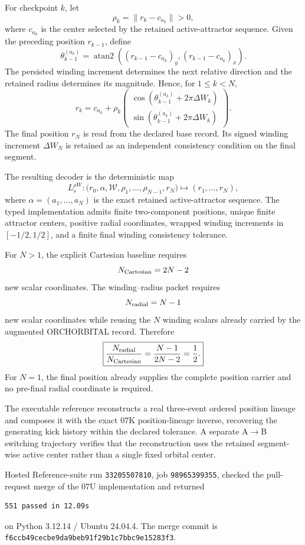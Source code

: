 For checkpoint $k$, let
\[
\rho_k=\|r_k-c_{a_k}\|>0,
\]
where $c_{a_k}$ is the center selected by the retained active-attractor sequence. Given the preceding position $r_{k-1}$, define
\[
\theta_{k-1}^{(a_k)}
=\operatorname{atan2}\!\left(
(r_{k-1}-c_{a_k})_y,
(r_{k-1}-c_{a_k})_x
\right).
\]
The persisted winding increment determines the next relative direction and the retained radius determines its magnitude. Hence, for $1\le k<N$,
\[
\boxed{
r_k=c_{a_k}+\rho_k
\begin{pmatrix}
\cos\!\left(\theta_{k-1}^{(a_k)}+2\pi\Delta W_k\right)\\
\sin\!\left(\theta_{k-1}^{(a_k)}+2\pi\Delta W_k\right)
\end{pmatrix}.
}
\]
The final position $r_N$ is read from the declared base record. Its signed winding increment $\Delta W_N$ is retained as an independent consistency condition on the final segment.

The resulting decoder is the deterministic map
\[
\boxed{
L_s^{\rho W}:
\bigl(r_0,\alpha,\mathcal W,\rho_1,\ldots,\rho_{N-1},r_N\bigr)
\longmapsto
(r_1,\ldots,r_N),
}
\]
where $\alpha=(a_1,\ldots,a_N)$ is the exact retained active-attractor sequence. The typed implementation admits finite two-component positions, unique finite attractor centers, positive radial coordinates, wrapped winding increments in $[-1/2,1/2]$, and a finite final winding consistency tolerance.

For $N>1$, the explicit Cartesian baseline requires
\[
N_{\rm Cartesian}=2N-2
\]
new scalar coordinates. The winding--radius packet requires
\[
N_{\rm radial}=N-1
\]
new scalar coordinates while reusing the $N$ winding scalars already carried by the augmented ORCHORBITAL record. Therefore
\[
\boxed{
\frac{N_{\rm radial}}{N_{\rm Cartesian}}
=\frac{N-1}{2N-2}
=\frac12.
}
\]
For $N=1$, the final position already supplies the complete position carrier and no pre-final radial coordinate is required.

The executable reference reconstructs a real three-event ordered position lineage and composes it with the exact 07K position-lineage inverse, recovering the generating kick history within the declared tolerance. A separate A$\to$B switching trajectory verifies that the reconstruction uses the retained segment-wise active center rather than a single fixed orbital center.

Hosted Reference-suite run \texttt{33205507810}, job \texttt{98965399355}, checked the pull-request merge of the 07U implementation and returned
\begin{verbatim}
551 passed in 12.09s
\end{verbatim}
on Python 3.12.14 / Ubuntu 24.04.4. The merge commit is \texttt{f6ccb49cecbe9da9beb91f29b1c7bbc9e15283f3}.

